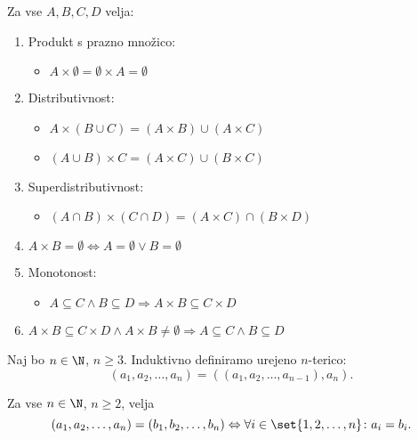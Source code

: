 \documentclass[12pt, a4paper]{article}
\renewcommand{\implies}{\Rightarrow}
\renewcommand{\iff}{\Leftrightarrow}
\begin{document}
\begin{izrek}
Za vse $A,B,C,D$ velja:

\begin{enumerate}
\item Produkt s prazno množico:

\begin{itemize}
\item $A\times\emptyset=\emptyset\times A=\emptyset$
\end{itemize}

\item Distributivnost:

\begin{itemize}
\item $A\times(B\cup C)=(A\times B)\cup(A\times C)$
\item $(A\cup B)\times C=(A\times C)\cup(B\times C)$
\end{itemize}

\item Superdistributivnost:

\begin{itemize}
\item $(A\cap B)\times (C\cap D)=(A\times C)\cap(B\times D)$
\end{itemize}

\item $A\times B=\emptyset\iff A=\emptyset\lor B=\emptyset$
\item Monotonost:

\begin{itemize}
\item $A\subseteq C\land B\subseteq D\implies A\times B\subseteq C\times D$
\end{itemize}
\item $A\times B\subseteq C\times D\land A\times B\ne\emptyset\implies A\subseteq C\land B\subseteq D$
\end{enumerate}
\end{izrek}

\begin{definicija}
Naj bo $n\in\N$, $n\geq 3$. Induktivno definiramo urejeno $n$-terico:
\[
(a_1,a_2,\dots,a_n)=((a_1,a_2,\dots,a_{n-1}),a_n).
\]
\end{definicija}

\begin{izrek}
Za vse $n\in\N$, $n\geq 2$, velja
\[
(a_1,a_2,\dots,a_n)=(b_1,b_2,\dots,b_n)\iff\forall i\in\set{1,2,\dots,n}\colon a_i=b_i.
\]
\end{izrek}
\end{document}
